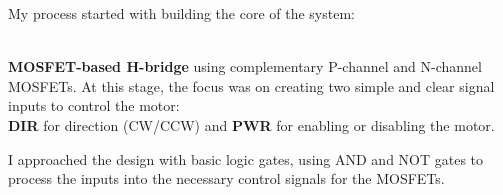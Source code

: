 \documentclass{article}
\begin{document}
\begin{minipage}{0.4\textwidth}
\begin{minipage}{1.6\textwidth}
My process started with building the core of the system:
\end{minipage}\\[8pt] 
\textbf{MOSFET-based H-bridge} using complementary P-channel and N-channel MOSFETs. At this stage, the focus was on creating two simple and clear signal inputs to control the motor:\\[8pt] 
\textbf{DIR} for direction (CW/CCW) and \textbf{PWR} for enabling or disabling the motor.\\[8pt]
\begin{minipage}{1.6\textwidth}
 I approached the design with basic logic gates, using {AND} and {NOT} gates to process the inputs into the necessary control signals for the MOSFETs. 
\end{minipage}
\end{minipage}\hspace*{0.4em}
\end{document}
